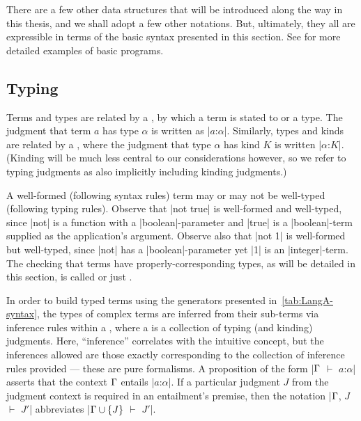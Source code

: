 There are a few other data structures that will be introduced along the way in this thesis, and we shall adopt a few other notations.
But, ultimately, they all are expressible in terms of the basic syntax presented in this section.
See \prelude{\LangA} for more detailed examples of basic \LangA programs.

\subsection{Typing}
\label{sec:LangA-typing}

Terms and types are related by a , by which a term is stated to  or  a type.
The judgment that term $a$ has type $α$ is written as \code|$a$:$α$|.
Similarly, types and kinds are related by a , where the judgment that type $α$ has kind $K$ is written \code|$α$:$K$|.
(Kinding will be much less central to our considerations however, so we refer to typing judgments as also implicitly including kinding judgments.)

A well-formed (following syntax rules) term may or may not be well-typed (following typing rules).
Observe that \code|not true| is well-formed and well-typed, since \code|not| is a function with a \code|boolean|-parameter and \code|true| is a \code|boolean|-term supplied as the application's argument.
Observe also that \code|not 1| is well-formed but  well-typed, since \code|not| has a \code|boolean|-parameter yet \code|1| is an \code|integer|-term.
The checking that terms have properly-corresponding types, as will be detailed in this section, is called  or just .

In order to build typed terms using the generators presented in~\ref{tab:LangA-syntax}, the types of complex terms are inferred from their sub-terms via inference rules within a , where a  is a collection of typing (and kinding) judgments.
Here, ``inference'' correlates with the intuitive concept, but the  inferences allowed are those exactly corresponding to the collection of inference rules provided --- these are pure formalisms.
A proposition of the form \code|$\Gamma$ $⊢$ $a$:$α$| asserts that the context $\Gamma$ entails \code|$a$:$α$|.
If a particular judgment $J$ from the judgment context is required in an entailment's premise, then the notation \code|$\Gamma$, $J$ $⊢$ $J'$| abbreviates \code|$\Gamma \cup \left\{ J \right\}$ $⊢$ $J'$|.

